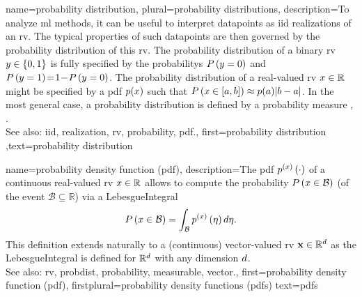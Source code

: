 {name={probability distribution}, plural={probability distributions},
	description={To analyze \gls{ml} methods, it can be useful 
		to interpret \glspl{datapoint} as \gls{iid} \glspl{realization} of an \gls{rv}. The typical 
		properties of such \glspl{datapoint} are then governed by the \gls{probability} distribution 
		of this \gls{rv}. The \gls{probability} distribution of a binary \gls{rv} $y \in \{0,1\}$ 
		is fully specified by the \glspl{probability} $P\left(y = 0\right)$ and 
		$P\left(y=1\right)\!=\!1\!-\!P\left(y=0\right)$. The \gls{probability} 
		distribution of a real-valued \gls{rv} $x \in \mathbb{R}$ might be specified 
		by a \gls{pdf} $p(x)$ such that $P\left( x \in [a,b] \right) \approx  p(a) |b-a|$. 
	    	In the most general case, a \gls{probability} distribution is defined by a \gls{probability} measure 
		\cite{BillingsleyProbMeasure}, \cite{GrayProbBook}.
	    		\\
		See also: \gls{iid}, \gls{realization}, \gls{rv}, \gls{probability}, \gls{pdf}.},
	first={probability distribution}
	,text={probability distribution}
}
    
    
{name={probability density function (pdf)},
	description={The pdf 
	$p^{(x)}\left(\cdot\right)$ of a continuous real-valued \gls{rv} $x \in \mathbb{R}$ 
	allows to compute the \gls{probability} $P\left(x \in \mathcal{B}\right)$ (of 
	the \gls{event} $\mathcal{B} \subseteq \mathbb{R}$)
	via a \gls{LebesgueIntegral} \cite[Ch. 3]{BertsekasProb}
	 $$P\left(x \in \mathcal{B}\right) = \int_{\mathcal{B}} p^{(x)}\left(\eta\right) d 
	 \eta.$$ 
	 This definition extends naturally to a (continuous) vector-valued \gls{rv} 
	 ${\bf x} \in \mathbb{R}^{d}$ as the \gls{LebesgueIntegral} 
	 is defined for $\mathbb{R}^{d}$ with any \gls{dimension} $d$. 
        		\\
		See also: \gls{rv}, \gls{probdist}, \gls{probability}, \gls{measurable}, \gls{vector}.},
	first={probability density function (pdf)},
	firstplural={probability density functions (pdfs)}
	text={pdfs}
}


